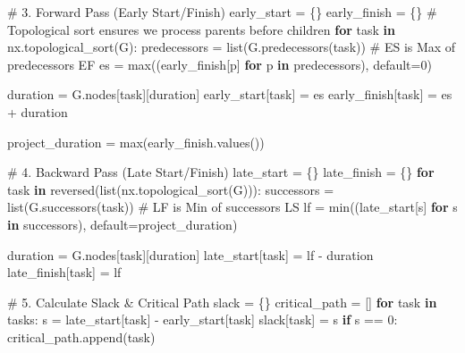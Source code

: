 \documentclass[
  letterpaper,
  DIV=11,
  numbers=noendperiod]{scrreprt}
\newenvironment{Shaded}{\begin{snugshade}}{\end{snugshade}}
\newcommand{\BuiltInTok}[1]{\textcolor[rgb]{0.00,0.23,0.31}{#1}}
\newcommand{\CommentTok}[1]{\textcolor[rgb]{0.37,0.37,0.37}{#1}}
\newcommand{\ControlFlowTok}[1]{\textcolor[rgb]{0.00,0.23,0.31}{\textbf{#1}}}
\newcommand{\DecValTok}[1]{\textcolor[rgb]{0.68,0.00,0.00}{#1}}
\newcommand{\KeywordTok}[1]{\textcolor[rgb]{0.00,0.23,0.31}{\textbf{#1}}}
\newcommand{\NormalTok}[1]{\textcolor[rgb]{0.00,0.23,0.31}{#1}}
\newcommand{\OperatorTok}[1]{\textcolor[rgb]{0.37,0.37,0.37}{#1}}
\newcommand{\StringTok}[1]{\textcolor[rgb]{0.13,0.47,0.30}{#1}}
\begin{document}
\begin{Shaded}
\begin{Highlighting}[]
\CommentTok{\# 3. Forward Pass (Early Start/Finish)}
\NormalTok{early\_start }\OperatorTok{=}\NormalTok{ \{\}}
\NormalTok{early\_finish }\OperatorTok{=}\NormalTok{ \{\}}
\CommentTok{\# Topological sort ensures we process parents before children}
\ControlFlowTok{for}\NormalTok{ task }\KeywordTok{in}\NormalTok{ nx.topological\_sort(G):}
\NormalTok{    predecessors }\OperatorTok{=} \BuiltInTok{list}\NormalTok{(G.predecessors(task))}
    \CommentTok{\# ES is Max of predecessors\textquotesingle{} EF}
\NormalTok{    es }\OperatorTok{=} \BuiltInTok{max}\NormalTok{((early\_finish[p] }\ControlFlowTok{for}\NormalTok{ p }\KeywordTok{in}\NormalTok{ predecessors), default}\OperatorTok{=}\DecValTok{0}\NormalTok{)}
    
\NormalTok{    duration }\OperatorTok{=}\NormalTok{ G.nodes[task][}\StringTok{\textquotesingle{}duration\textquotesingle{}}\NormalTok{]}
\NormalTok{    early\_start[task] }\OperatorTok{=}\NormalTok{ es}
\NormalTok{    early\_finish[task] }\OperatorTok{=}\NormalTok{ es }\OperatorTok{+}\NormalTok{ duration}

\NormalTok{project\_duration }\OperatorTok{=} \BuiltInTok{max}\NormalTok{(early\_finish.values())}

\CommentTok{\# 4. Backward Pass (Late Start/Finish)}
\NormalTok{late\_start }\OperatorTok{=}\NormalTok{ \{\}}
\NormalTok{late\_finish }\OperatorTok{=}\NormalTok{ \{\}}
\ControlFlowTok{for}\NormalTok{ task }\KeywordTok{in} \BuiltInTok{reversed}\NormalTok{(}\BuiltInTok{list}\NormalTok{(nx.topological\_sort(G))):}
\NormalTok{    successors }\OperatorTok{=} \BuiltInTok{list}\NormalTok{(G.successors(task))}
    \CommentTok{\# LF is Min of successors\textquotesingle{} LS}
\NormalTok{    lf }\OperatorTok{=} \BuiltInTok{min}\NormalTok{((late\_start[s] }\ControlFlowTok{for}\NormalTok{ s }\KeywordTok{in}\NormalTok{ successors), default}\OperatorTok{=}\NormalTok{project\_duration)}
    
\NormalTok{    duration }\OperatorTok{=}\NormalTok{ G.nodes[task][}\StringTok{\textquotesingle{}duration\textquotesingle{}}\NormalTok{]}
\NormalTok{    late\_start[task] }\OperatorTok{=}\NormalTok{ lf }\OperatorTok{{-}}\NormalTok{ duration}
\NormalTok{    late\_finish[task] }\OperatorTok{=}\NormalTok{ lf}

\CommentTok{\# 5. Calculate Slack \& Critical Path}
\NormalTok{slack }\OperatorTok{=}\NormalTok{ \{\}}
\NormalTok{critical\_path }\OperatorTok{=}\NormalTok{ []}
\ControlFlowTok{for}\NormalTok{ task }\KeywordTok{in}\NormalTok{ tasks:}
\NormalTok{    s }\OperatorTok{=}\NormalTok{ late\_start[task] }\OperatorTok{{-}}\NormalTok{ early\_start[task]}
\NormalTok{    slack[task] }\OperatorTok{=}\NormalTok{ s}
    \ControlFlowTok{if}\NormalTok{ s }\OperatorTok{==} \DecValTok{0}\NormalTok{:}
\NormalTok{        critical\_path.append(task)}


\end{Highlighting}
\end{Shaded}
\end{document}
